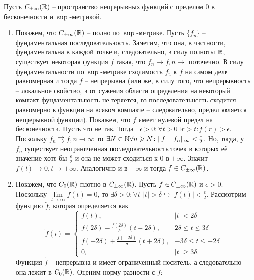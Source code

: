 \begin{solve}
    Пусть $C_{\pm\infty}(\mathbb{R})$ -- пространство непрерывных функций с пределом 0 в бесконечности и $\sup$-метрикой.
    \begin{enumerate}
        \item Покажем, что $C_{\pm\infty}(\mathbb{R})$ -- полно по $\sup$-метрике. Пусть $\{f_n\}$ -- фундаментальная последовательность. Заметим, что она, в частности, фундаментальна в каждой точке и, следовательно, в силу полноты $\mathbb{R}$, существует некоторая функция $f$ такая, что $f_n \rightarrow f, n \rightarrow$ поточечно. В силу фундаментальности по $\sup$-метрике сходимость $f_n$ к $f$ на самом деле равномерная и тогда $f$ -- непрерывна (или же, в силу того, что непрерывность -- локальное свойство, и от сужения области определения на некоторый компакт фундаментальность не теряется, то последовательность сходится равномерно к функции на всяком компакте -- следовательно, предел является непрерывной функции). Покажем, что $f$ имеет нулевой предел на бесконечности. Пусть это не так. Тогда $\exists \epsilon > 0 \colon \forall t > 0 \exists r > t \colon f(r) > \epsilon$. Поскольку $f_n \rightrightarrows f, n \rightarrow \infty$ то $\exists N \in \mathbb{N} \forall n \geqslant N\colon \|f - f_n\|_{\infty} < \frac{\varepsilon}{2}$. Но, тогда, у $f_n$ существует неограниченная последовательность точек в которых её значение хотя бы $\frac{\epsilon}{2}$ и она не может сходиться к 0 в $+\infty$. Значит $f(t) \rightarrow 0, t \rightarrow +\infty$. Аналогично и в $-\infty$ и тогда $f \in C_{\pm\infty}(\mathbb{R})$.
        \item Покажем, что $C_0(\mathbb{R})$ плотно в $C_{\pm\infty}(\mathbb{R})$. Пусть $f \in C_{\pm\infty}(\mathbb{R})$ и $\epsilon > 0$. Поскольку $\lim\limits_{t \rightarrow \infty} f(t) = 0$, то $\exists \delta > 0 \colon \forall t\colon |t| > \delta \hookrightarrow |f(t)| < \frac{\epsilon}{2}$. Рассмотрим функцию $\tilde{f}$, которая определяется как
        \[
            \tilde{f}(t) =
            \begin{cases}
                f(t), & |t| < 2\delta \\
                f(2\delta) - \frac{f(2\delta)}{\delta}(t - 2\delta), & 2\delta \leq t \leq 3\delta \\
                f(-2\delta) + \frac{f(-2\delta)}{\delta}(t + 2\delta), & -3\delta \leq t \leq -2\delta \\
                0, & |t| \geq 3\delta.
            \end{cases}
        \]
        Функция $\tilde{f}$ -- непрерывна и имеет ограниченный носитель, а следовательно она лежит в $C_{0}(\mathbb{R})$. Оценим норму разности с $f\colon$

\end{enumerate}
\end{solve}
